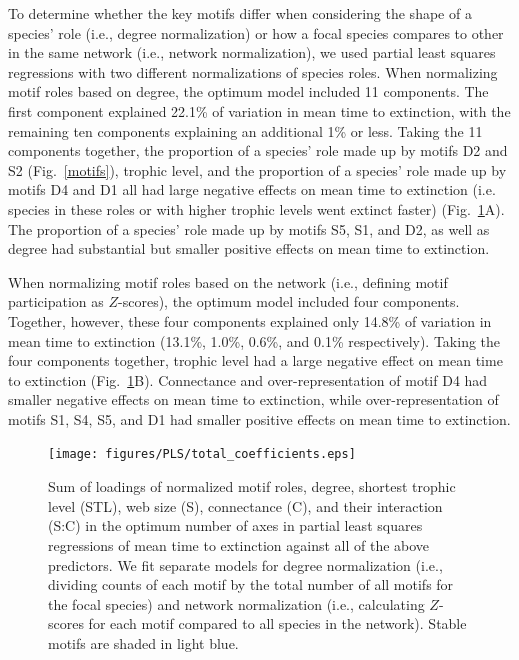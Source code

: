 \documentclass[12pt]{article}
\begin{document}
        
        To determine whether the key motifs differ when considering the shape of a species' role (i.e., degree normalization) or how a focal species compares to other in the same network (i.e., network normalization), we used partial least squares regressions with two different normalizations of species roles.
    When normalizing motif roles based on degree, the optimum model included 11 components.
    The first component explained 22.1\% of variation in mean time to extinction, with the remaining ten components explaining an additional 1\% or less.
    Taking the 11 components together, the proportion of a species' role made up by motifs D2 and S2 (Fig.~\ref{motifs}), trophic level, and the proportion of a species' role made up by motifs D4 and D1 all had large negative effects on mean time to extinction (i.e. species in these roles or with higher trophic levels went extinct faster) (Fig.~\ref{coefficient_sum}A).
    The proportion of a species' role made up by motifs S5, S1, and D2, as well as degree had substantial but smaller positive effects on mean time to extinction.


    When normalizing motif roles based on the network (i.e., defining motif participation as $Z$-scores), the optimum model included four components.
    Together, however, these four components explained only 14.8\% of variation in mean time to extinction (13.1\%, 1.0\%, 0.6\%, and 0.1\% respectively).
    Taking the four components together, trophic level had a large negative effect on mean time to extinction (Fig.~\ref{coefficient_sum}B).
    Connectance and over-representation of motif D4 had smaller negative effects on mean time to extinction, while over-representation of motifs S1, S4, S5, and D1 had smaller positive effects on mean time to extinction.


    \begin{figure}[hb!]
      \caption{Sum of loadings of normalized motif roles, degree, shortest trophic level (STL), web size (S), connectance (C), and their interaction (S:C) in the optimum number of axes in partial least squares regressions of mean time to extinction against all of the above predictors. We fit separate models for degree normalization (i.e., dividing counts of each motif by the total number of all motifs for the focal species) and network normalization (i.e., calculating $Z$-scores for each motif compared to all species in the network). Stable motifs are shaded in light blue.}
      \label{coefficient_sum}
      \texttt{[image: figures/PLS/total\_coefficients.eps]}
      \end{figure}
\end{document}
